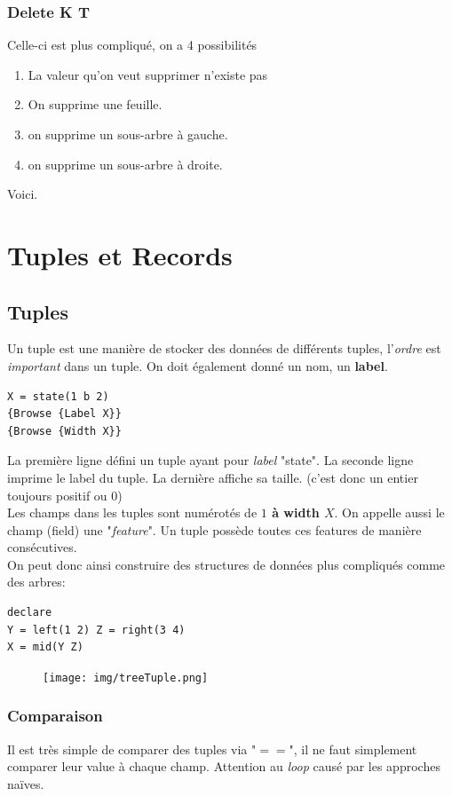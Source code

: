 \documentclass{report}
\begin{document}
\subsubsection{Delete K T}
Celle-ci est plus compliqué, on a 4 possibilités
\begin{enumerate}
\item La valeur qu'on veut supprimer n'existe pas
\item On supprime une feuille.
\item on supprime un sous-arbre à gauche.
\item on supprime un sous-arbre à droite.
\end{enumerate}
Voici.

\section{Tuples et Records}

\subsection{Tuples}
Un tuple est une manière de stocker des données de différents tuples, l'\textit{ordre} est \textit{important} dans un tuple. On doit également donné un nom, un \textbf{label}.
\begin{lstlisting}
X = state(1 b 2)
{Browse {Label X}}
{Browse {Width X}}
\end{lstlisting}
La première ligne défini un tuple ayant pour \textit{label} "state". La seconde ligne imprime le label du tuple. La dernière affiche sa taille. (c'est donc un entier toujours positif ou $0$)\\
Les champs dans les tuples sont numérotés de\textbf{ $1$ à width $X$}. On appelle aussi le champ (field) une "\textit{feature}". Un tuple possède toutes ces features de manière consécutives.\\

On peut donc ainsi construire des structures de données plus compliqués comme des arbres:
\begin{lstlisting}
declare
Y = left(1 2) Z = right(3 4)
X = mid(Y Z)
\end{lstlisting}

\begin{figure}[H]
\centering
\texttt{[image: img/treeTuple.png]}
\end{figure}
\subsubsection{Comparaison}
Il est très simple de comparer des tuples via "$==$", il ne faut simplement comparer leur value à chaque champ. Attention au \textit{loop} causé par les approches naïves.\\
\end{document}
